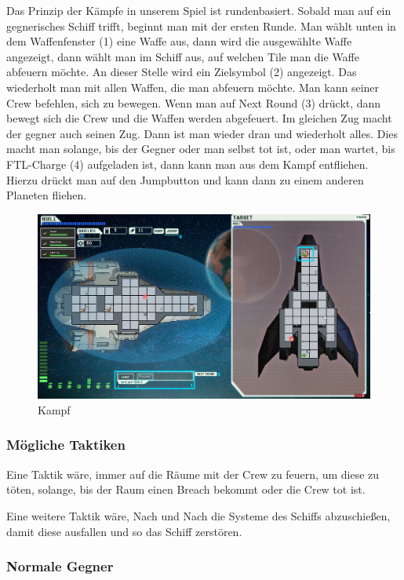 \documentclass[fontsize=12pt,paper=a4,twoside]{scrartcl}
\begin{document}
Das Prinzip der Kämpfe in unserem Spiel ist rundenbasiert. Sobald man auf ein gegnerisches Schiff trifft, beginnt man mit der ersten Runde. Man wählt unten in dem Waffenfenster (1) eine Waffe aus, dann wird die ausgewählte Waffe angezeigt, dann wählt man im Schiff aus, auf welchen Tile man die Waffe abfeuern möchte. An dieser Stelle wird ein Zielsymbol (2) angezeigt. Das wiederholt man mit allen Waffen, die man abfeuern möchte. Man kann seiner Crew befehlen, sich zu bewegen. Wenn man auf Next Round (3) drückt, dann bewegt sich die Crew und die Waffen werden abgefeuert. Im gleichen Zug macht der gegner auch seinen Zug. Dann ist man wieder dran und wiederholt alles. Dies macht man solange, bis der Gegner oder man selbst tot ist, oder man wartet, bis FTL-Charge (4) aufgeladen ist, dann kann man aus dem Kampf entfliehen. Hierzu drückt man auf den Jumpbutton und kann dann zu einem anderen Planeten fliehen. 

\begin{figure}[H]
\centering
\includegraphics[width=1\linewidth]{DasSpiel/Kampf/fight.png}
\caption{Kampf}
\end{figure}

\subsubsection{Mögliche Taktiken}

Eine Taktik wäre, immer auf die Räume mit der Crew zu feuern, um diese zu töten, solange, bis der Raum einen Breach bekommt oder die Crew tot ist. 

Eine weitere Taktik wäre, Nach und Nach die Systeme des Schiffs abzuschießen, damit diese ausfallen und so das Schiff zerstören. 

\subsubsection{Normale Gegner}
\end{document}

